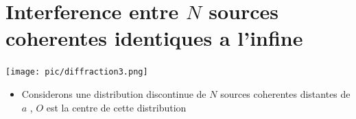 \documentclass[12pt]{book}
\begin{document}
        \section{Interference entre $N$ sources coherentes identiques a l'infine}
            \begin{minipage}{0.59\linewidth}
                \texttt{[image: pic/diffraction3.png]}
            \end{minipage}
            \begin{minipage}{0.39\linewidth}
                \begin{itemize}
                    \item Considerons une distribution discontinue de $N$ sources coherentes distantes de $a$ , $O$ est la centre de cette distribution 
                \end{itemize}
            \end{minipage}
\end{document}

